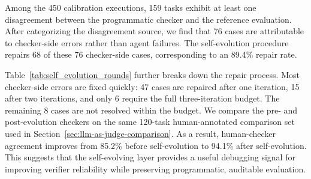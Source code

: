 Among the
450 calibration executions, 159 tasks exhibit at least one disagreement between the programmatic
checker and the reference evaluation. After categorizing the disagreement source, we find that
76 cases are attributable to checker-side errors rather than agent failures.
The self-evolution procedure repairs 68 of these 76 checker-side cases, corresponding to an 89.4\%
repair rate.

Table~\ref{tab:self_evolution_rounds} further breaks down the repair process. Most checker-side
errors are fixed quickly: 47 cases are repaired after one iteration, 15 after two iterations, and only
6 require the full three-iteration budget. The remaining 8 cases are not resolved within the budget.
We compare the pre- and post-evolution checkers on the
same 120-task human-annotated comparison set used in
Section~\ref{sec:llm-as-judge-comparison}. As a result, human-checker agreement improves from 85.2\% before self-evolution to 94.1\% after
self-evolution. This suggests that the self-evolving layer provides a useful debugging signal for
improving verifier reliability while preserving programmatic, auditable evaluation.